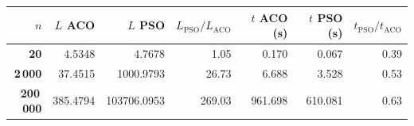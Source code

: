 \renewcommand{\arraystretch}{1.2}
\begin{tabular}{|r|r|r|r|r|r|r|}
\hline
\rowcolor{gray!20} \textbf{$n$} & \textbf{$L$ ACO} & \textbf{$L$ PSO} & \textbf{$L_{\mathrm{PSO}}/L_{\mathrm{ACO}}$} & \textbf{$t$ ACO (s)} & \textbf{$t$ PSO (s)} & \textbf{$t_{\mathrm{PSO}}/t_{\mathrm{ACO}}$} \\
\hline
\textbf{20} & 4.5348 & 4.7678 & 1.05 & 0.170 & 0.067 & 0.39 \\
\hline
\textbf{2\,000} & 37.4515 & 1000.9793 & 26.73 & 6.688 & 3.528 & 0.53 \\
\hline
\textbf{200\,000} & 385.4794 & 103706.0953 & 269.03 & 961.698 & 610.081 & 0.63 \\
\hline
\end{tabular}
